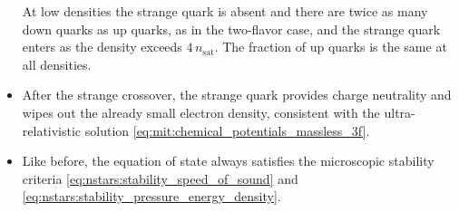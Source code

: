 \begin{itemize}
      At low densities the strange quark is absent and there are twice as many down quarks as up quarks, as in the two-flavor case,
      and the strange quark enters as the density exceeds $4 \, n_\text{sat}$.
      The fraction of up quarks is the same at all densities.
\item After the strange crossover, the strange quark provides charge neutrality and wipes out the already small electron density,
      consistent with the ultra-relativistic solution \eqref{eq:mit:chemical_potentials_massless_3f}.
\item Like before, the equation of state always satisfies the microscopic stability criteria \eqref{eq:nstars:stability_speed_of_sound} and \eqref{eq:nstars:stability_pressure_energy_density}.
\end{itemize}

